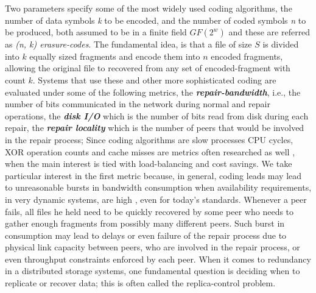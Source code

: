 \documentclass[runningheads]{llncs}
\begin{document}
Two parameters specify some of the most widely used coding algorithms, the number of data symbols \textit{k} to be encoded, and the number of coded symbols \textit{n} to be produced, both assumed to be in a finite field $GF(2^w)$ and these are referred as \textit{(n, k) erasure-codes}. The fundamental idea, is that a file of size $S$ is divided into $k$ equally sized fragments and encode them into $n$ encoded fragments, allowing the original file to recovered from any set of encoded-fragment with count $k$. Systems that use these and other more sophisticated coding are evaluated under some of the following metrics, the \textbf{\textit{repair-bandwidth}}, i.e., the number of bits communicated in the network during normal and repair operations, the \textbf{\textit{disk I/O}} which is the number of bits read from disk during each repair, the \textbf{\textit{repair locality}} which is the number of peers that would be involved in the repair process; Since coding algorithms are slow processes CPU cycles, XOR operation counts and cache misses are metrics often researched as well \cite{fast_coding}, when the main interest is tied with load-balancing and cost savings. We take particular interest in the first metric because, in general, coding leads may lead to unreasonable bursts in bandwidth consumption when availability requirements, in very dynamic systems, are high \cite{coding-problems}, even for today's standards. Whenever a peer fails, all files he held need to be quickly recovered by some peer who needs to gather enough fragments from possibly many different peers. Such burst in consumption may lead to delays or even failure of the repair process due to physical link capacity between peers, who are involved in the repair process, or even throughput constraints enforced by each peer. When it comes to redundancy in a distributed storage systems, one fundamental question is deciding when to replicate or recover data; this is often called the replica-control problem.
\end{document}
